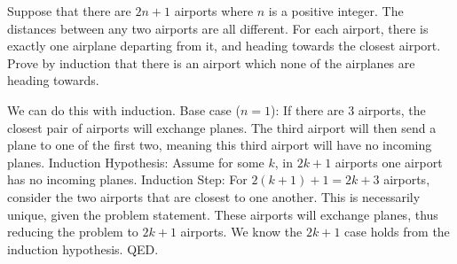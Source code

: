 \question Suppose that there are $2n+1$ airports where $n$ is a positive integer. The distances between any two airports are all different. For each airport, there is exactly one airplane departing from it, and heading towards the closest airport. Prove by induction that there is an airport which none of the airplanes are heading towards.

\begin{solution}
We can do this with induction. \newline
Base case ($n = 1$): If there are 3 airports, the closest pair of airports
will exchange planes. The third airport will then send a plane to one of the first two,
meaning this third airport will have no incoming planes. \newline
Induction Hypothesis: Assume for some $k$, in $2k+1$ airports one airport has no incoming planes. \newline
Induction Step: For $2(k+1) + 1 = 2k + 3$ airports, consider the two airports that are closest to one another.
This is necessarily unique, given the problem statement. These airports will exchange planes, thus reducing the problem
to $2k + 1$ airports. We know the $2k+1$ case holds from the induction hypothesis. QED.
\end{solution}